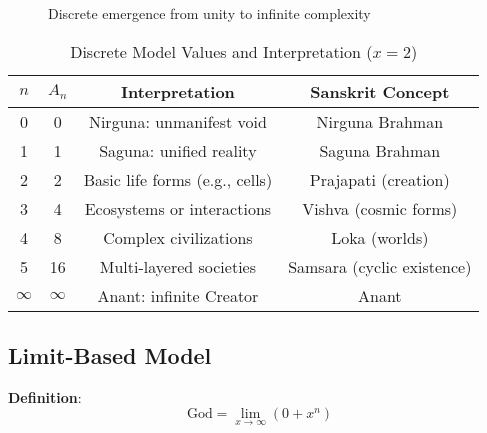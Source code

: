 \documentclass[11pt]{article}
\begin{document}
\begin{figure}[h]
\centering
{}
\caption{Discrete emergence from unity to infinite complexity}
\label{fig:A_n_plot}
\end{figure}

\begin{table}[h]
\centering
\caption{Discrete Model Values and Interpretation ($x = 2$)}
\begin{tabular}{c c c c}
\toprule
\( n \) & \( A_n \) & Interpretation & Sanskrit Concept \\
\midrule
0 & 0 & Nirguna: unmanifest void & Nirguna Brahman \\
1 & 1 & Saguna: unified reality & Saguna Brahman \\
2 & 2 & Basic life forms (e.g., cells) & Prajapati (creation) \\
3 & 4 & Ecosystems or interactions & Vishva (cosmic forms) \\
4 & 8 & Complex civilizations & Loka (worlds) \\
5 & 16 & Multi-layered societies & Samsara (cyclic existence) \\
\(\infty\) & \(\infty\) & Anant: infinite Creator & Anant \\
\bottomrule
\end{tabular}
\label{tab:discrete}
\end{table}

\subsection{Limit-Based Model}
\textbf{Definition}: 
\[
\text{God} = \lim_{x \to \infty} (0 + x^n)
\]
\end{document}
